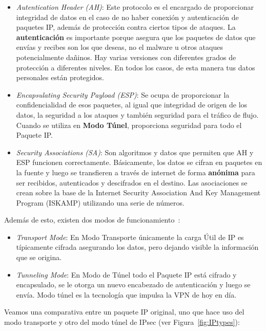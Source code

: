 \begin{itemize}
	\item \textit{Autentication Header (AH)}: Este protocolo es el encargado de proporcionar integridad de datos en el caso de no haber conexión y autenticación de paquetes IP, además de protección contra ciertos tipos de ataques. 
	La \textbf{autenticación} es importante porque asegura que los paquetes de datos que envías y recibes son los que deseas, no el malware u otros ataques potencialmente dañinos. Hay varias versiones con diferentes grados de protección a diferentes niveles. En todos los casos, de esta manera tus datos personales están protegidos.
		
 	\item \textit{Encapsulating Security Payload (ESP)}: Se ocupa de proporcionar la confidencialidad de esos paquetes, al igual que integridad de origen de los datos, la seguridad a los ataques y también seguridad para el tráfico de flujo. Cuando se utiliza en \textbf{Modo Túnel}, proporciona seguridad para todo el Paquete IP.
 	
	\item \textit{Security Associations (SA)}: Son algoritmos y datos que permiten que AH y ESP funcionen correctamente. 
	Básicamente, los datos se cifran en paquetes en la fuente y luego se transfieren a través de internet de forma \textbf{anónima} para ser recibidos, autenticados y descifrados en el destino. Las asociaciones se crean sobre la base de la Internet Security Association And Key Management Program (ISKAMP) utilizando una serie de números.
\end{itemize}

Además de esto, existen dos modos de funcionamiento~\cite{article:ibm_ip}:

\begin{itemize}
	\item \textit{Transport Mode}: En Modo Transporte únicamente la carga Útil de IP es típicamente cifrada asegurando los datos, pero dejando visible la información que se origina.
	
	\item \textit{Tunneling Mode}: En Modo de Túnel todo el Paquete IP está cifrado y encapsulado, se le otorga un nuevo encabezado de autenticación y luego se envía. Modo túnel es la tecnología que impulsa la VPN de hoy en día.
\end{itemize}

Veamos una comparativa entre un paquete IP original, uno que hace uso del modo transporte y otro del modo túnel de IPsec (ver Figura~\ref{fig:IPtypes}):


